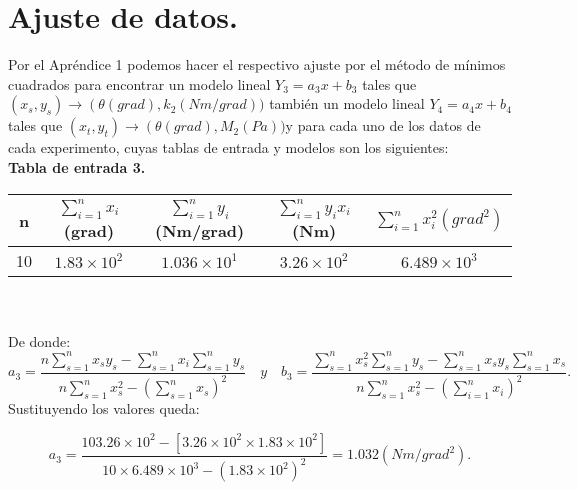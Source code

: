 \documentclass[10pt,a4paper]{article}
\begin{document}
\section*{Ajuste de datos.}
Por el Apr\'{e}ndice 1 podemos hacer el respectivo ajuste por el m\'{e}todo de m\'{i}nimos cuadrados para encontrar un modelo lineal ${Y}_{3}={a}_{3}x +{b}_{3}$ tales que $\left( { x }_{ s },{ y }_{ s } \right) \rightarrow \left( \theta(grad),{k}_{2} (Nm/grad))$  tambi\'{e}n un modelo lineal ${Y}_{4}={a}_{4}x +{b}_{4}$ tales que $\left( { x }_{ t },{ y }_{ t } \right) \rightarrow \left( \theta(grad), {M}_{2}(Pa))$y para cada uno de los datos de cada experimento, cuyas tablas de entrada y modelos son los siguientes:
\medskip
\\
\textbf{Tabla de entrada 3.}
\\
\begin{figure 6}
\centering
\begin{tabular}{|c|c|c|c|c|}
\hline 
n&$\sum _{ i=1 }^{ n }{ { x }_{ i } } $(grad) & $\sum _{ i=1 }^{ n }{ { y }_{ i } }$(Nm/grad) & $ \sum _{ i=1 }^{ n }{ { y }_{ i } } { x }_{ i }$ (Nm) & $\sum _{ i=1 }^{ n }{ { x }_{ i }^{ 2 } }({ grad }^{ 2 })$ \\ 

\hline 
10&$1.83\times { 10 }^{ 2 }$& $1.036\times { 10 }^{ 1 }$ & $3.26\times { 10 }^{ 2 }$ & $6.489\times { 10 }^{ 3 }$\\ 
\hline 
\end{tabular}
\end{figure 6} 
\\
\\
De donde:
\[{a}_{3}=\frac { n\sum _{s=1 }^{ n }{ { x }_{ s }{ y }_{ s } } -\sum _{ s=1 }^{ n }{ { x }_{ i } } \sum _{ s=1 }^{ n }{ { y }_{ s } }  }{ n\sum _{ s=1 }^{ n }{ { x }_{ s }^{ 2 } } -{ \left( \sum _{ s=1 }^{ n }{ { x }_{ s } }  \right)  }^{ 2 } } \quad y\quad {b}_{3}=\frac { \sum _{ s=1 }^{ n }{ { x }_{ s }^{ 2 } } \sum _{ s=1 }^{ n }{ { y }_{ s } } -\sum _{ s=1 }^{ n }{ { x }_{ s }{ y }_{ s } } \sum _{ s=1 }^{ n }{ { x }_{ s } }  }{ n\sum _{ s=1 }^{ n }{ { x }_{ s }^{ 2 } } -{ \left( \sum _{ i=1 }^{ n }{ { x }_{ i } }  \right)  }^{ 2 } }.\]
Sustituyendo los valores queda:

\[{a}_{3}=\frac { 103.26\times { 10 }^{ 2 }-\left[3.26\times { 10 }^{ 2 }\times 1.83\times { 10 }^{ 2 }  \right]  }{ 10\times 6.489\times { 10 }^{ 3 }-{ \left( 1.83\times { 10 }^{ 2 }\right)  }^{ 2 } } =1.032(Nm/{grad}^{ 2 }).\]
\end{document}
